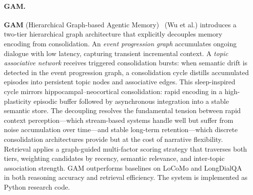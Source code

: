 \paragraph{GAM.}
\textbf{GAM} (Hierarchical Graph-based Agentic Memory)~\cite{gam2026}
(Wu et al.) introduces a two-tier hierarchical graph architecture that
explicitly decouples memory encoding from consolidation.  An
\emph{event progression graph} accumulates ongoing dialogue with low
latency, capturing transient incremental context.  A
\emph{topic associative network} receives triggered consolidation bursts:
when semantic drift is detected in the event progression graph, a
consolidation cycle distills accumulated episodes into persistent topic
nodes and associative edges.  This sleep-inspired cycle mirrors
hippocampal--neocortical consolidation: rapid encoding in a
high-plasticity episodic buffer followed by asynchronous integration
into a stable semantic store.  The decoupling resolves the fundamental
tension between rapid context perception---which stream-based systems
handle well but suffer from noise accumulation over time---and stable
long-term retention---which discrete consolidation architectures
provide but at the cost of narrative flexibility.  Retrieval applies a
graph-guided multi-factor scoring strategy that traverses both tiers,
weighting candidates by recency, semantic relevance, and inter-topic
association strength.  GAM outperforms baselines on LoCoMo and
LongDialQA in both reasoning accuracy and retrieval efficiency.  The
system is implemented as Python research code.

